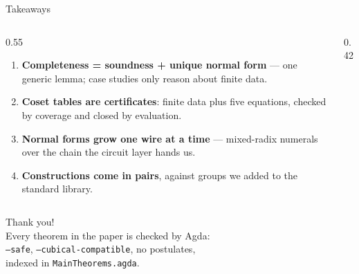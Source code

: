\begin{frame}{Takeaways}
\begin{columns}[c]
\begin{column}{0.55\textwidth}
\begin{enumerate}
  \setlength{\itemsep}{8pt}
  \item \textbf{Completeness = soundness + unique normal form} --- one generic
        lemma; case studies only reason about finite data.
  \item \textbf{Coset tables are certificates}: finite data plus five equations,
        checked by coverage and closed by evaluation.
  \item \textbf{Normal forms grow one wire at a time} --- mixed-radix numerals over
        the chain the circuit layer hands us.
  \item \textbf{Constructions come in pairs}, against groups we added to the
        standard library.
\end{enumerate}
\end{column}
\begin{column}{0.42\textwidth}
\centering
{}
\end{column}
\end{columns}
\end{frame}

\begin{frame}[standout]
Thank you!\\[12pt]
{\normalsize\mdseries Every theorem in the paper is checked by Agda:\\
\texttt{--safe}, \texttt{--cubical-compatible}, no postulates,\\
indexed in \texttt{MainTheorems.agda}.}
\end{frame}
